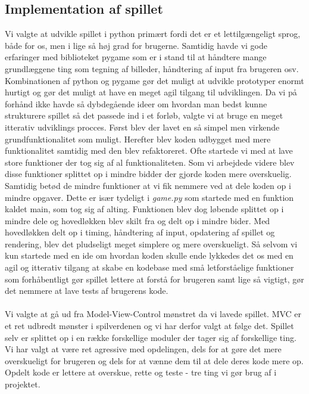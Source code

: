 \documentclass[10pt,a4paper,danish]{article}
\begin{document}
\subsection{Implementation af spillet}
Vi valgte at udvikle spillet i python primært fordi det er et lettilgængeligt sprog, både for os, men i lige så høj grad for brugerne. Samtidig havde vi gode erfaringer med biblioteket pygame som er i stand til at håndtere mange grundlæggene ting som tegning af billeder, håndtering af input fra brugeren osv.
Kombinationen af python og pygame gør det muligt at udvikle prototyper enormt hurtigt og gør det muligt at have en meget agil tilgang til udviklingen. Da vi på forhånd ikke havde så dybdegående ideer om hvordan man bedst kunne strukturere spillet så det passede ind i et forløb, valgte vi at bruge en meget itterativ udviklings procces. Først blev der lavet en så simpel men virkende grundfunktionalitet som muligt. Herefter blev koden udbygget med mere funktionalitet samtidig med den blev refaktoreret. Ofte startede vi med at lave store funktioner der tog sig af al funktionaliteten. Som vi arbejdede videre blev disse funktioner splittet op i mindre bidder der gjorde koden mere overskuelig. Samtidig betød de mindre funktioner at vi fik nemmere ved at dele koden op i mindre opgaver. Dette er især tydeligt i \textit{game.py} som startede med en funktion kaldet main, som tog sig af alting. Funktionen blev dog løbende splittet op i mindre dele og hovedløkken blev skilt fra og delt op i mindre bider. Med hovedløkken delt op i timing, håndtering af input, opdatering af spillet og rendering, blev det pludseligt meget simplere og mere overskueligt. Så selvom vi kun startede med en ide om hvordan koden skulle ende lykkedes det os med en agil og itterativ tilgang at skabe en kodebase med små letforståelige funktioner som forhåbentligt gør spillet lettere at forstå for brugeren samt lige så vigtigt, gør det nemmere at lave tests af brugerens kode.

\paragraph{}
Vi valgte at gå ud fra Model-View-Control mønstret da vi lavede spillet. MVC er et ret udbredt mønster i spilverdenen og vi har derfor valgt at følge det. 
Spillet selv er splittet op i en række forskellige moduler der tager sig af forskellige ting. Vi har valgt at være ret agressive med opdelingen, dels for at gøre det mere overskueligt for brugeren og dels for at vænne dem til at dele deres kode mere op. Opdelt kode er lettere at overskue, rette og teste - tre ting vi gør brug af i projektet.
\end{document}
